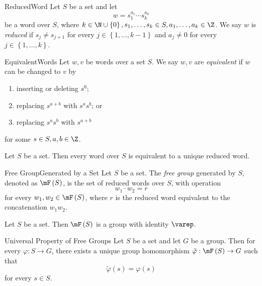 \documentclass[pmath347]{subfiles}
\begin{document}
    \begin{definition}{Reduced}{Word}
        Let $S$ be a set and let
        \begin{equation*}
            w = s_1^{a_1}\cdots s_k^{a_k}
        \end{equation*}
        be a word over $S$, where $k\in\N\cup\left\lbrace 0 \right\rbrace, s_1,\ldots,s_k\in S, a_1,\ldots,a_k\in\Z$. We say $w$ is \emph{reduced} if $s_j\neq s_{j+1}$ for every $j\in\left\lbrace 1,\ldots,k-1 \right\rbrace$ and $a_j\neq 0$ for every $j\in\left\lbrace 1,\ldots,k \right\rbrace$. 
    \end{definition}

    \begin{definition}{Equivalent}{Words}
        Let $w,v$ be words over a set $S$. We say $w,v$ are \emph{equivalent} if $w$ can be changed to $v$ by
        \begin{enumerate}
            \item inserting or deleting $s^0$; 
            \item replacing $s^{a+b}$ with $s^as^b$; or
            \item replacing $s^as^b$ with $s^{a+b}$
            \end{enumerate}
        for some $s\in S, a,b\in\Z$.
    \end{definition}

    \begin{prop}{}
        Let $S$ be a set. Then every word over $S$ is equivalent to a unique reduced word.
    \end{prop}

    \begin{definition}{Free Group}{Generated by a Set}
        Let $S$ be a set. The \emph{free group} generated by $S$, denoted as $\mF\left( S \right)$, is the set of reduced words over $S$, with operation
        \begin{equation*}
            w_1\cdot w_2 = r
        \end{equation*}
        for every $w_1,w_2\in\mF\left( S \right)$, where $r$ is the reduced word equivalent to the concatenation $w_1w_2$.
    \end{definition}

    \begin{prop}{}
        Let $S$ be a set. Then $\mF\left( S \right)$ is a group with identity $\varep$.
    \end{prop}

    \begin{theorem}{Universal Property of Free Groups}
        Let $S$ be a set and let $G$ be a group. Then for every $\varphi:S\to G$, there exists a unique group homomorphism $\tilde{\varphi}:\mF\left( S \right) \to G$ such that
        \begin{equation*}
            \tilde{\varphi} \left( s \right) = \varphi\left( s \right) 
        \end{equation*}
        for every $s\in S$.
    \end{theorem}
\end{document}
